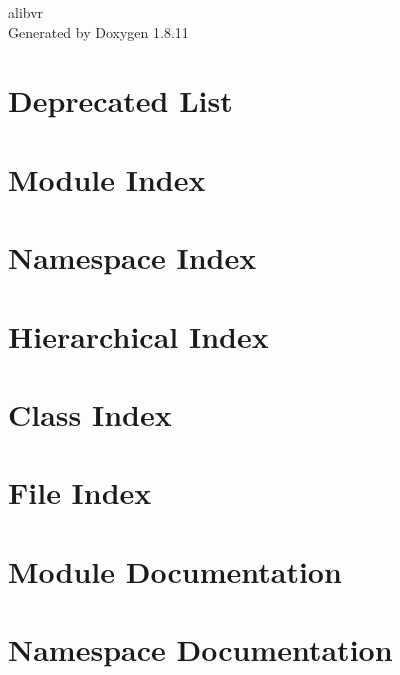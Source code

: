 \documentclass[twoside]{book}
\newcommand{\+}{\discretionary{\mbox{\scriptsize$\hookleftarrow$}}{}{}}
\newcommand{\clearemptydoublepage}{%
  \newpage{\pagestyle{empty}\cleardoublepage}%
}
\begin{document}
\hypersetup{pageanchor=false,
             bookmarksnumbered=true,
             pdfencoding=unicode
            }
\begin{titlepage}
\vspace*{7cm}
\begin{center}%
{\Large alibvr }\\
\vspace*{1cm}
{\large Generated by Doxygen 1.8.11}\\
\end{center}
\end{titlepage}
\clearemptydoublepage
\tableofcontents
\clearemptydoublepage
{}
\hypersetup{pageanchor=true}

\chapter{Deprecated List}
\label{deprecated}
\hypertarget{deprecated}{}

\chapter{Module Index}

\chapter{Namespace Index}

\chapter{Hierarchical Index}

\chapter{Class Index}

\chapter{File Index}

\chapter{Module Documentation}

\chapter{Namespace Documentation}





\end{document}
